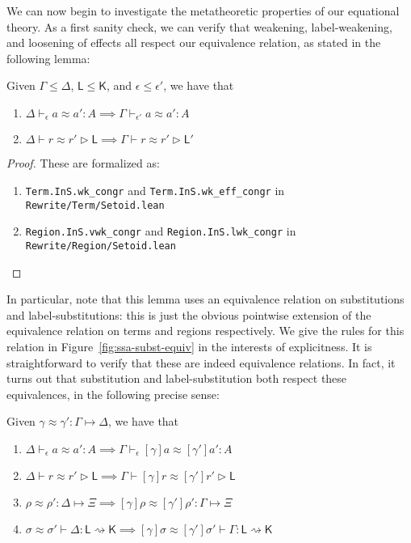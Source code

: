 \documentclass[acmsmall,screen,review]{acmart}
\newcommand{\ms}[1]{\ensuremath{\mathsf{#1}}}
\newcommand{\issubst}[3]{#1: #2 \mapsto #3}
\newcommand{\lbsubst}[4]{#1 \vdash #2: #3 \rightsquigarrow #4}
\newcommand{\teqv}{\approx}
\newcommand{\tmeq}[5]{#1 \vdash_{#2} #3 \teqv #4 : {#5}}
\newcommand{\lbeq}[4]{#1 \vdash #2 \teqv #3 \rhd {#4}}
\newcommand{\tmseq}[4]{\issubst{#1 \teqv #2}{#3}{#4}}
\newcommand{\lbseq}[5]{\lbsubst{#1 \teqv #2}{#3}{#4}{#5}}
\begin{document}
We can now begin to investigate the metatheoretic properties of our equational theory. As a first
sanity check, we can verify that weakening, label-weakening, and loosening of effects all respect
our equivalence relation, as stated in the following lemma:
\begin{lemma}
  Given $\Gamma \leq \Delta$, $\ms{L} \leq \ms{K}$, and $\epsilon \leq \epsilon'$, we have that
  \begin{enumerate}[label=(\alph*)]
    \item $\tmeq{\Delta}{\epsilon}{a}{a'}{A} \implies \tmeq{\Gamma}{\epsilon'}{a}{a'}{A}$
    \item $\lbeq{\Delta}{r}{r'}{\ms{L}} \implies \lbeq{\Gamma}{r}{r'}{\ms{L}'}$
  \end{enumerate}
\end{lemma}
\begin{proof}
  These are formalized as:
  \begin{enumerate}[label=(\alph*)]
    \item \texttt{Term.InS.wk_congr} and \texttt{Term.InS.wk_eff_congr} in 
    \texttt{Rewrite/Term/Setoid.lean}
    \item \texttt{Region.InS.vwk_congr} and \texttt{Region.InS.lwk_congr} in
    \texttt{Rewrite/Region/Setoid.lean}
  \end{enumerate}
\end{proof}
In particular, note that this lemma uses an equivalence relation on substitutions and
label-substitutions: this is just the obvious pointwise extension of the equivalence relation on
terms and regions respectively. We give the rules for this relation in
Figure~\ref{fig:ssa-subst-equiv} in the interests of explicitness. It is straightforward to verify
that these are indeed equivalence relations.  In fact, it turns out that substitution and
label-substitution both respect these equivalences, in the following precise sense:
\begin{lemma}
  Given $\tmseq{\gamma}{\gamma'}{\Gamma}{\Delta}$, we have that
  \begin{enumerate}[label=(\alph*)]
    \item $\tmeq{\Delta}{\epsilon}{a}{a'}{A} 
      \implies \tmeq{\Gamma}{\epsilon}{[\gamma]a}{[\gamma']a'}{A}$
    \item $\lbeq{\Delta}{r}{r'}{\ms{L}} 
      \implies \lbeq{\Gamma}{[\gamma]r}{[\gamma']r'}{\ms{L}}$
    \item $\tmseq{\rho}{\rho'}{\Delta}{\Xi}
      \implies \tmseq{[\gamma]\rho}{[\gamma']\rho'}{\Gamma}{\Xi}$
    \item $\lbseq{\sigma}{\sigma'}{\Delta}{\ms{L}}{\ms{K}}
      \implies \lbseq{[\gamma]\sigma}{[\gamma']\sigma'}{\Gamma}{\ms{L}}{\ms{K}}$
  \end{enumerate}
\end{lemma}
\end{document}
